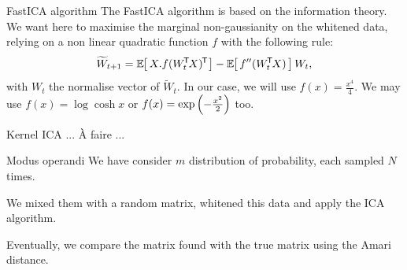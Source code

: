 \documentclass{beamer}
\begin{document}
\begin{frame}{}
\begin{columns}[T]
\begin{column}{.48\linewidth}

\begin{block}{FastICA algorithm}
The FastICA algorithm is based on the information theory. We want here to maximise the marginal non-gaussianity on the whitened data, relying on a non linear quadratic function $f$ with the following rule:\begin{equation}
  \widetilde W_{t+1} = \zesp{X.\ztr{f(\ztr{W_t}X)}} - \zesp{f''(\ztr{W_t}X)}W_t,
\end{equation}
with $W_t$ the normalise vector of $\widetilde W_t$. In our case, we will use $f(x) = \frac{x^4}4$. We may use $f(x) = \log \cosh x$ or $f(x) = \exp\zp{-\frac{x^2}2}$ too.
\end{block}


\begin{block}{Kernel ICA}
\vspace{3cm}... À faire ...\vspace{3cm}
\end{block}


\begin{block}{Modus operandi}
We have consider $m$ distribution of probability, each sampled $N$ times.

We mixed them with a random matrix, whitened this data and apply the ICA algorithm.

Eventually, we compare the matrix found with the true matrix using the Amari distance.
\end{block}



\end{column}
\end{columns}
\end{frame}
\end{document}
